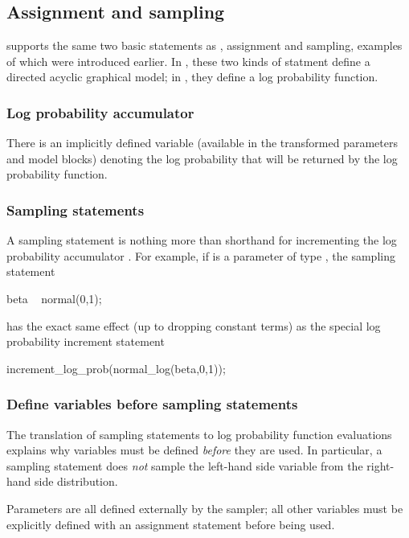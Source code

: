 \documentclass[article]{jss}
\begin{document}
\subsection{Assignment and sampling}

 supports the same two basic statements as
, assignment and sampling, examples of which were
introduced earlier.  In , these two kinds of statment
define a directed acyclic graphical model; in , they
define a log probability function. 

\subsubsection{Log probability accumulator}

There is an implicitly defined variable  (available in 
the transformed parameters and model blocks) denoting the log
probability that will be returned by the log probability function.  

\subsubsection{Sampling statements}

A sampling statement is nothing more than shorthand for incrementing
the log probability accumulator .  For example, if
 is a parameter of type , the sampling statement
%
\begin{Code}
beta ~ normal(0,1);
\end{Code}
%
has the exact same effect (up to dropping constant terms) as the
special log probability increment statement
%
\begin{Code}
increment_log_prob(normal_log(beta,0,1));
\end{Code}


\subsubsection{Define variables before sampling statements}

The translation of sampling statements to log probability function
evaluations explains why variables must be defined {\it before} they
are used.  In particular, a sampling statement does \emph{not} sample
the left-hand side variable from the right-hand side distribution.

Parameters are all defined externally by the sampler; all other
variables must be explicitly defined with an assignment statement
before being used.
\end{document}

